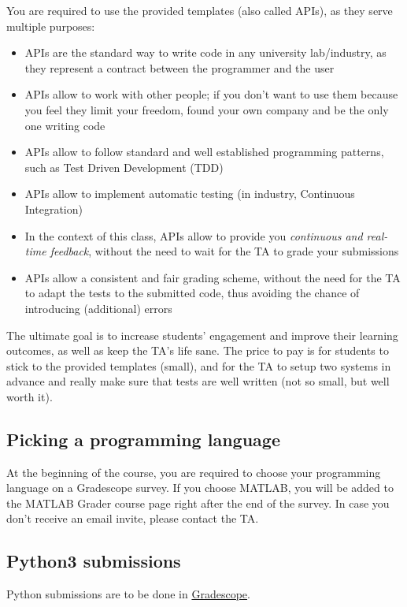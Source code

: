 \documentclass[11pt, reqno]{amsart} %
\newcommand{\gradescope}{https://www.gradescope.com/courses/219666}
\begin{document}
You are required to use the provided templates (also called APIs), as they serve multiple purposes:
\begin{itemize}
    \item APIs are the standard way to write code in any university lab/industry, as they represent a contract between the programmer and the user
    \item APIs allow to work with other people; if you don't want to use them because you feel they limit your freedom,
    found your own company and be the only one writing code
    \item APIs allow to follow standard and well established programming patterns, such as Test Driven Development (TDD)
    \item APIs allow to implement automatic testing (in industry, Continuous Integration)
    \item In the context of this class, APIs allow to provide you \textit{continuous and real-time feedback}, without the need to wait for the TA to grade your submissions
    \item APIs allow a consistent and fair grading scheme, without the need for the TA to adapt the tests to the submitted code, thus avoiding the chance of introducing (additional) errors
\end{itemize}

The ultimate goal is to increase students' engagement and improve their learning outcomes, as well as keep the TA's life sane.
The price to pay is for students to stick to the provided templates (small), and for the TA to setup two systems in advance and really make sure that tests are well written (not so small, but well worth it).

\subsection{Picking a programming language}

At the beginning of the course, you are required to choose your programming language on a Gradescope survey.
If you choose MATLAB, you will be added to the MATLAB Grader course page right after the end of the survey.
In case you don't receive an email invite, please contact the TA.

\subsection{Python3 submissions}

Python submissions are to be done in \href{\gradescope}{Gradescope}.
\end{document}

